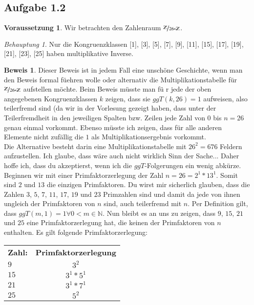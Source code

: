 \documentclass{article}
\newcommand*{\7}{\textbackslash}
\newcommand*{\N}{{\mathbb{N}}}
\newcommand*{\Z}{{\mathbb{Z}}}
\theoremstyle{remark}
\newtheorem*{Behauptung}{Behauptung}
\theoremstyle{definition}
\newtheorem*{Beweis}{Beweis}
\newtheorem*{Voraussetzung}{Voraussetzung}
\begin{document}
	\subsection*{Aufgabe 1.2}

	\begin{Voraussetzung}
		Wir betrachten den Zahlenraum $\nicefrac{\Z}{26*\Z}$.
	\end{Voraussetzung}

	\begin{Behauptung}
		Nur die Kongruenzklassen [1], [3], [5], [7], [9], [11], [15], [17], [19], [21], [23], [25] haben multiplikative Inverse.
	\end{Behauptung}

	\begin{Beweis}
		Dieser Beweis ist in jedem Fall eine unsch\"one Geschichte, wenn man den Beweis formal f\"uehren wolle oder alternativ die Multiplikationstabelle f\"ur $\nicefrac{\Z}{26*\Z}$ aufstellen m\"ochte. Beim Beweis m\"usste man f\"u r jede der oben angegebenen Kongruenzklassen $k$ zeigen, dass sie $ggT(k, 26)=1$ aufweisen, also teilerfremd sind (da wir in der Vorlesung gezeigt haben, dass unter der Teilerfremdheit in den jeweiligen Spalten bzw. Zeilen jede Zahl von $0$ bis $n=26$ genau einmal vorkommt. Ebenso m\"usste ich zeigen, dass f\"ur alle anderen Elemente nicht zuf\"allig die $1$ als Multiplikationsergebnis vorkommt.\\
		Die Alternative besteht darin eine Multiplikationstabelle mit $26^2=676$ Feldern aufzustellen. Ich glaube, dass w\"are auch nicht wirklich Sinn der Sache... Daher hoffe ich, dass du akzeptierst, wenn ich die $ggT$-Folgerungen ein wenig abk\"urze.\\
		Beginnen wir mit einer Primfaktorzerlegung der Zahl $n=26=2^1*13^1$. Somit sind $2$ und $13$ die einzigen Primfaktoren. Du wirst mir sicherlich glauben, dass die Zahlen $3$, $5$, $7$, $11$, $17$, $19$ und $23$ Primzahlen sind und damit da jede von ihnen ungleich der Primfaktoren von $n$ sind, auch teilerfremd mit $n$. Per Definition gilt, dass $ggT(m,1)=1\forall0<m\in\N$. Nun bleibt es an uns zu zeigen, dass $9$, $15$, $21$ und $25$ eine Primfaktorzerlegung hat, die keinen der Primfaktoren von $n$ enthalten. Es gilt folgende Primfaktorzerlegung:

		\begin{tabular}{lc}
 			\textbf{Zahl:}&\textbf{Primfaktorzerlegung}\\
			$9$&$3^2$\\
			$15$&$3^1*5^1$\\
			$21$&$3^1*7^1$\\
			$25$&$5^2$
		\end{tabular}


\end{Beweis}
\end{document}
